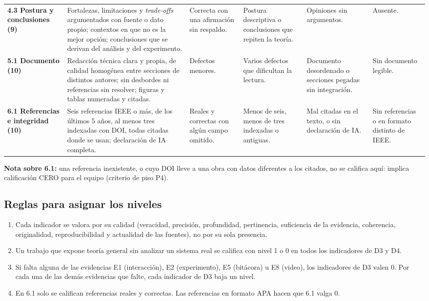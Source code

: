 \documentclass[11pt,a4paper]{article}
\begin{document}
\begin{landscape}
{\begin{xltabular}{\linewidth}{@{}L{3.0cm}YYYYL{2.4cm}@{}}
	\addlinespace
	\textbf{4.3 Postura y conclusiones (9)} & Fortalezas, limitaciones y \emph{trade-offs} argumentados con fuente o dato propio; contextos en que no es la mejor opción; conclusiones que se derivan del análisis y del experimento. & Correcta con una afirmación sin respaldo. & Postura descriptiva o conclusiones que repiten la teoría. & Opiniones sin argumentos. & Ausente. \\
	\addlinespace
	\textbf{5.1 Documento (10)} & Redacción técnica clara y propia, de calidad homogénea entre secciones de distintos autores; sin desbordes ni referencias sin resolver; figuras y tablas numeradas y citadas. & Defectos menores. & Varios defectos que dificultan la lectura. & Documento desordenado o secciones pegadas sin integración. & Sin documento legible. \\
	\addlinespace
	\textbf{6.1 Referencias e integridad (10)} & Seis referencias IEEE o más, de los últimos 5 años, al menos tres indexadas con DOI, todas citadas donde se usan; declaración de IA completa. & Reales y correctas con algún campo omitido. & Menos de seis, menos de tres indexadas o antiguas. & Mal citadas en el texto, o sin declaración de IA. & Sin referencias o en formato distinto de IEEE. \\
	\bottomrule
\end{xltabular}
\textbf{Nota sobre 6.1:} una referencia inexistente, o cuyo DOI lleve a una obra con datos diferentes a los citados, no se califica aquí: implica calificación CERO para el equipo (criterio de piso P4).
}
\end{landscape}

\subsection{Reglas para asignar los niveles}

\begin{enumerate}
	\item Cada indicador se valora por su calidad (veracidad, precisión, profundidad, pertinencia, suficiencia de la evidencia, coherencia, originalidad, reproducibilidad y actualidad de las fuentes), no por su sola presencia.
	\item Un trabajo que expone teoría general sin analizar un sistema real se califica con nivel 1 o 0 en todos los indicadores de D3 y D4.
	\item Si falta alguna de las evidencias E1 (interacción), E2 (experimento), E5 (bitácora) u E8 (video), los indicadores de D3 valen 0. Por cada una de las demás evidencias que falte, cada indicador de D3 baja un nivel.
	\item En 6.1 solo se califican referencias reales y correctas. Las referencias en formato APA hacen que 6.1 valga 0.
\end{enumerate}
\end{document}
